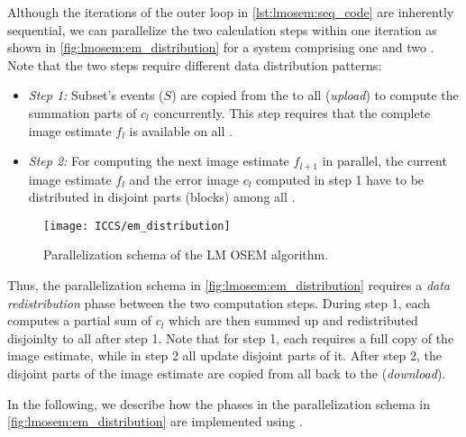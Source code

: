 Although the iterations of the outer loop in \autoref{lst:lmosem:seq_code} are inherently sequential, we can parallelize the two calculation steps within one iteration as shown in \autoref{fig:lmosem:em_distribution} for a system comprising one \CPU and two \GPUs.
Note that the two steps require different data distribution patterns:
\begin{itemize}
  \item[] \emph{Step 1:} Subset's events ($S$) are copied from the \CPU to all \GPUs (\emph{upload}) to compute the summation parts of $c_l$ concurrently. This step requires that the complete image estimate $f_l$ is available on all \GPUs.
  \item[] \emph{Step 2:} For computing the next image estimate $f_{l+1}$ in parallel, the current image estimate $f_l$ and the error image $c_l$ computed in step 1 have to be distributed in disjoint parts (blocks) among all \GPUs.
\end{itemize}

\begin{figure}
  \centering
  \texttt{[image: ICCS/em\_distribution]}
  \caption{Parallelization schema of the LM OSEM algorithm.}
  \label{fig:lmosem:em_distribution}
\end{figure}
Thus, the parallelization schema in \autoref{fig:lmosem:em_distribution} requires a \emph{data redistribution} phase between the two computation steps.
During step 1, each \GPU computes a partial sum of $c_l$ which are then summed up and redistributed disjoinlty to all \GPUs after step 1.
Note that for step 1, each \GPU requires a full copy of the image estimate, while in step 2 all \GPUs update disjoint parts of it.
After step 2, the disjoint parts of the image estimate are copied from all \GPUs back to the \CPU (\emph{download}).

\bigskip\noindent
In the following, we describe how the phases in the parallelization schema in \autoref{fig:lmosem:em_distribution} are implemented using \OpenCL.

